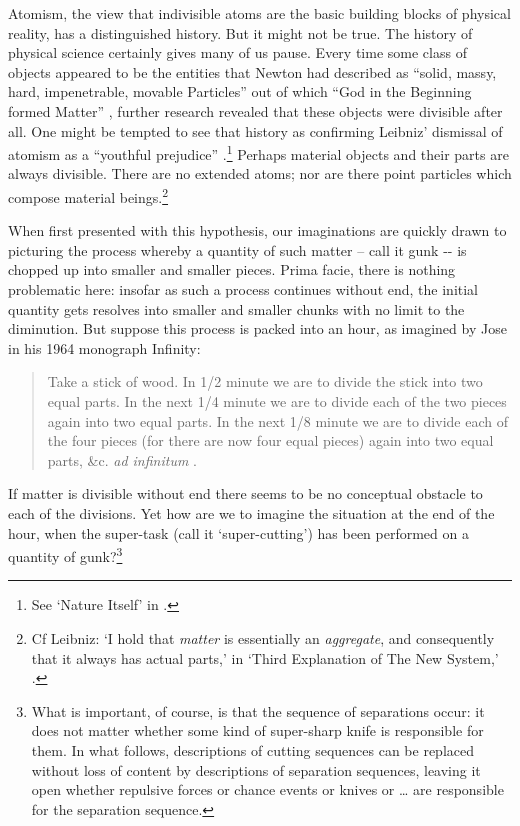 Atomism, the view that indivisible atoms are the basic building blocks of physical reality, has a distinguished history. But it might not be true. The history of physical science certainly gives many of us pause. Every time some class of objects appeared to be the entities that Newton had described as  ``solid, massy, hard, impenetrable, movable Particles'' out of which ``God in the Beginning formed Matter'' \cite[400]{Newton1952}, further research revealed that these objects were divisible after all. One might be tempted to see that history as confirming Leibniz' dismissal of atomism as a ``youthful prejudice'' .\footnote{See `Nature Itself' in \cite[220]{Leibniz1998}.} Perhaps material objects and their parts are always divisible. There are no extended atoms; nor are there point particles which compose material beings.\footnote{Cf Leibniz: `I hold that \textit{matter }is essentially an \textit{aggregate}, and consequently that it always has actual parts,' in `Third Explanation of The New System,' \cite[193]{Leibniz1998}.} 

When first presented with this hypothesis, our imaginations are quickly drawn to picturing the process whereby a quantity of such matter -- call it gunk -{}- is chopped up into smaller and smaller pieces. Prima facie, there is nothing problematic here: insofar as such a process continues without end, the initial quantity gets resolves into smaller and smaller chunks with no limit to the diminution. But suppose this process is packed into an hour, as imagined by Jose \citeauthor{Bernadete1964} in his 1964 monograph Infinity:

\begin{quote}
Take a stick of wood. In 1/2 minute we are to divide the stick into two equal parts. In the next 1/4 minute we are to divide each of the two pieces again into two equal parts. In the next 1/8 minute we are to divide each of the four pieces (for there are now four equal pieces) again into two equal parts, \&c.\textit{ ad infinitum} \cite[184]{Bernadete1964}.
\end{quote}

\noindent If matter is divisible without end there seems to be no conceptual obstacle to each of the divisions. Yet how are we to imagine the situation at the end of the hour, when the super-task (call it `super-cutting') has been performed on a quantity of gunk?\footnote{What is important, of course, is that the sequence of separations occur: it does not matter whether some kind of super-sharp knife is responsible for them. In what follows, descriptions of cutting sequences can be replaced without loss of content by descriptions of separation sequences, leaving it open whether repulsive forces or chance events or knives or {\dots} are responsible for the separation sequence.} 

